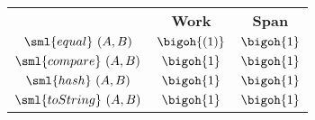 \begin{costspec}[UnitElt]
\label{cost:unit}
\begin{tabular}{c|c|c}
& \textbf{Work} & \textbf{Span} \\
$\sml{equal}~(A,B)$ & $\bigoh {(1)}$ & $\bigoh {1}$ \\
$\sml{compare}~(A,B)$ & $\bigoh {1}$ & $\bigoh {1}$ \\
$\sml{hash}~(A,B)$ & $\bigoh {1}$ & $\bigoh {1}$ \\
$\sml{toString}~(A,B)$ & $\bigoh {1}$ & $\bigoh {1}$ \\
\end{tabular}
\end{costspec}
